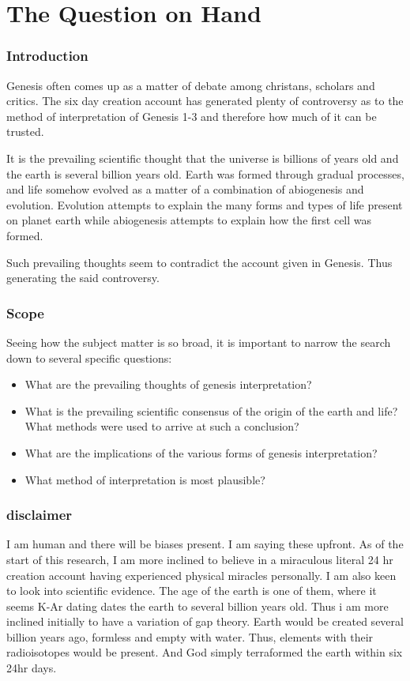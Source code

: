 \documentclass[11]{article}
\begin{document}
\part{The Question on Hand}

\section{Introduction}

Genesis often comes up as a matter of debate among christans, scholars and critics. The six day creation account has generated plenty of controversy as to the method of interpretation of Genesis 1-3 and therefore how much of it can be trusted. 

It is the prevailing scientific thought that the universe is billions of years old and the earth is several billion years old. Earth was formed through gradual processes, and life somehow evolved as a matter of a combination of abiogenesis and evolution. Evolution attempts to explain the many forms and types of life present on planet earth while abiogenesis attempts to explain how the first cell was formed.


Such prevailing thoughts seem to contradict the account given in Genesis. Thus generating the said controversy.

\section{Scope}

Seeing how the subject matter is so broad, it is important to narrow the search down to several specific questions:

\begin{itemize}
\item What are the prevailing thoughts of genesis interpretation?
\item What is the prevailing scientific consensus of the origin of the earth and life? What methods were used to arrive at such a conclusion?
\item What are the implications of the various forms of genesis interpretation?
\item What method of interpretation is most plausible?
\end{itemize}

\section{disclaimer}

I am human and there will be biases present. I am saying these upfront. As of the start of this research, I am more inclined to believe in a miraculous literal 24 hr creation account having experienced physical miracles personally. I am also keen to look into scientific evidence. The age of the earth is one of them, where it seems K-Ar dating dates the earth to several billion years old. Thus i am more inclined initially to have a variation of gap theory. Earth would be created several billion years ago, formless and empty with water. Thus, elements with their radioisotopes would be present. And God simply terraformed the earth within six 24hr days.
\end{document}
